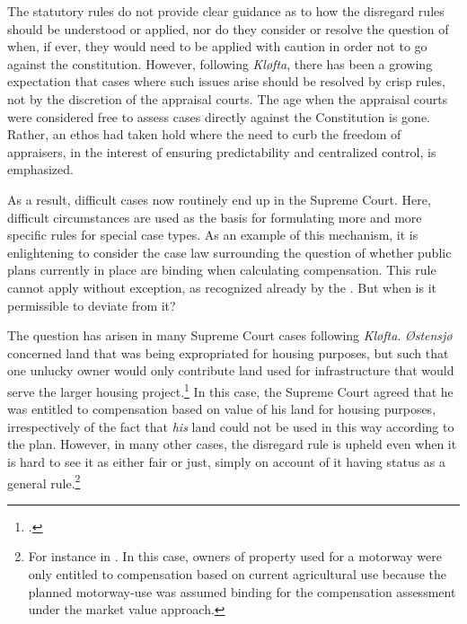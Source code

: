 
The statutory rules do not provide clear guidance as to how the disregard rules should be understood or applied, nor do they consider or resolve the question of when, if ever, they would need to be applied with caution in order not to go against the constitution. However, following {\it Kløfta}, there has been a growing expectation that cases where such issues arise should be resolved by crisp rules, not by the discretion of the appraisal courts. The age when the appraisal courts were considered free to assess cases directly against the Constitution is gone. Rather, an ethos had taken hold where the need to curb the freedom of appraisers, in the interest of ensuring predictability and centralized control, is emphasized.

As a result, difficult cases now routinely end up in the Supreme Court. Here, difficult circumstances are used as the basis for formulating more and more specific rules for special case types. As an example of this mechanism, it is enlightening to consider the case law surrounding the question of whether public plans currently in place are binding when calculating compensation. This rule cannot apply without exception, as recognized already by the \cite{ca73}. But when is it permissible to deviate from it?

The question has arisen in many Supreme Court cases following {\it Kløfta}. \emph{Østensjø} concerned land that was being expropriated for housing purposes, but such that one unlucky owner would only contribute land used for infrastructure that would serve the larger housing project.\footnote{\cite{ostensjo77}.} In this case, the Supreme Court agreed that he was entitled to compensation based on value of his land for housing purposes, irrespectively of the fact that \emph{his} land could not be used in this way according to the plan. However, in many other cases, the disregard rule is upheld even when it is hard to see it as either fair or just, simply on account of it having status as a general rule.\footnote{For instance in \cite{malvik93}. In this case, owners of property used for a motorway were only entitled to compensation based on current agricultural use because the planned motorway-use was assumed binding for the compensation assessment under the market value approach.}

